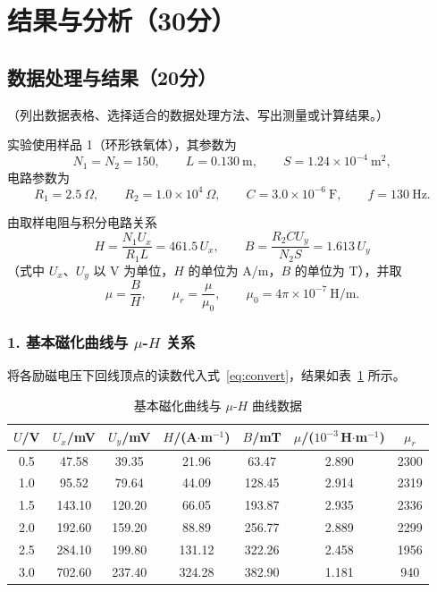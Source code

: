 \documentclass{Phyport}
\begin{document}
\section{结果与分析（30分）}
\subsection{数据处理与结果（20分）}
（列出数据表格、选择适合的数据处理方法、写出测量或计算结果。）

实验使用样品 1（环形铁氧体），其参数为
\begin{equation*}
    N_1=N_2=150,\qquad L=0.130\ \mathrm{m},\qquad S=1.24\times10^{-4}\ \mathrm{m^2},
\end{equation*}
电路参数为
\begin{equation*}
    R_1=2.5\ \Omega,\qquad R_2=1.0\times10^{4}\ \Omega,\qquad C=3.0\times10^{-6}\ \mathrm{F},\qquad f=130\ \mathrm{Hz}.
\end{equation*}

由取样电阻与积分电路关系
\begin{equation}
    H=\frac{N_1U_x}{R_1L}=461.5\,U_x,\qquad
    B=\frac{R_2CU_y}{N_2S}=1.613\,U_y
    \label{eq:convert}
\end{equation}
（式中 $U_x$、$U_y$ 以 V 为单位，$H$ 的单位为 A/m，$B$ 的单位为 T），并取
\begin{equation*}
    \mu=\frac{B}{H},\qquad \mu_r=\frac{\mu}{\mu_0},\qquad \mu_0=4\pi\times10^{-7}\ \mathrm{H/m}.
\end{equation*}

\subsubsection*{1. 基本磁化曲线与 $\mu$-$H$ 关系}

将各励磁电压下回线顶点的读数代入式~\eqref{eq:convert}，结果如表~\ref{tab:basic} 所示。

\begin{table}[H]
    \centering
    \caption{基本磁化曲线与 $\mu$-$H$ 曲线数据}
    \label{tab:basic}
    \begin{tabular}{ccccccc}
        \toprule
        $U$/V & $U_x$/mV & $U_y$/mV & $H$/(A$\cdot$m$^{-1}$) & $B$/mT & $\mu$/($10^{-3}$\,H$\cdot$m$^{-1}$) & $\mu_r$ \\
        \midrule
        0.5 & 47.58  & 39.35  & 21.96  & 63.47  & 2.890 & 2300 \\
        1.0 & 95.52  & 79.64  & 44.09  & 128.45 & 2.914 & 2319 \\
        1.5 & 143.10 & 120.20 & 66.05  & 193.87 & 2.935 & 2336 \\
        2.0 & 192.60 & 159.20 & 88.89  & 256.77 & 2.889 & 2299 \\
        2.5 & 284.10 & 199.80 & 131.12 & 322.26 & 2.458 & 1956 \\
        3.0 & 702.60 & 237.40 & 324.28 & 382.90 & 1.181 & 940  \\
        \bottomrule
    \end{tabular}
\end{table}
\end{document}
